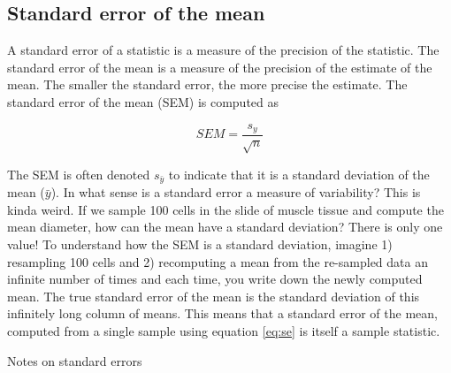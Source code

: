 \documentclass[]{book}
\theoremstyle{definition}
\theoremstyle{definition}
\theoremstyle{definition}
\theoremstyle{remark}
\begin{document}
\subsection{Standard error of the
mean}\label{standard-error-of-the-mean}

A standard error of a statistic is a measure of the precision of the
statistic. The standard error of the mean is a measure of the precision
of the estimate of the mean. The smaller the standard error, the more
precise the estimate. The standard error of the mean (SEM) is computed
as

\begin{equation}
SEM = \frac{s_y}{\sqrt{n}}
\label{eq:se}
\end{equation}

The SEM is often denoted \(s_{\bar{y}}\) to indicate that it is a
standard deviation of the mean (\(\bar{y}\)). In what sense is a
standard error a measure of variability? This is kinda weird. If we
sample 100 cells in the slide of muscle tissue and compute the mean
diameter, how can the mean have a standard deviation? There is only one
value! To understand how the SEM is a standard deviation, imagine 1)
resampling 100 cells and 2) recomputing a mean from the re-sampled data
an infinite number of times and each time, you write down the newly
computed mean. The true standard error of the mean is the standard
deviation of this infinitely long column of means. This means that a
standard error of the mean, computed from a single sample using equation
\eqref{eq:se} is itself a sample statistic.

Notes on standard errors
\end{document}
